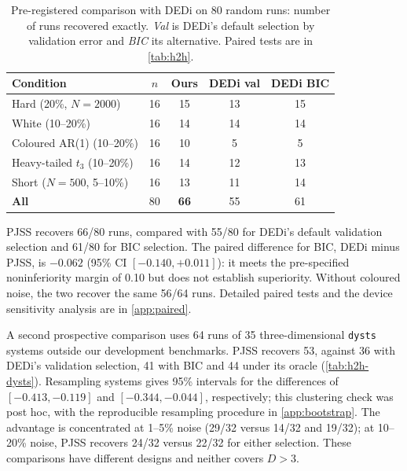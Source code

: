 \begin{table}[t]
\centering
\caption{Pre-registered comparison with DEDi on 80 random runs: number of runs recovered exactly. \emph{Val} is DEDi's default selection by validation error and \emph{BIC} its alternative. Paired tests are in \cref{tab:h2h}.}
\label{tab:dedi}
\small
\begin{tabular}{@{}lcccc@{}}
\toprule
Condition & $n$ & \textbf{Ours} & DEDi val & DEDi BIC \\
\midrule
Hard (20\%, $N=2000$) & 16 & 15 & 13 & 15 \\
White (10--20\%) & 16 & 14 & 14 & 14 \\
Coloured AR(1) (10--20\%) & 16 & 10 & 5 & 5 \\
Heavy-tailed $t_3$ (10--20\%) & 16 & 14 & 12 & 13 \\
Short ($N=500$, 5--10\%) & 16 & 13 & 11 & 14 \\
\midrule
\textbf{All} & 80 & \textbf{66} & 55 & 61 \\
\bottomrule
\end{tabular}
\end{table}

PJSS recovers 66/80 runs, compared with 55/80 for DEDi's default validation selection and 61/80 for BIC selection. The paired difference for BIC, DEDi minus PJSS, is $-0.062$ (95\% CI $[-0.140,+0.011]$): it meets the pre-specified noninferiority margin of 0.10 but does not establish superiority. Without coloured noise, the two recover the same 56/64 runs. Detailed paired tests and the device sensitivity analysis are in \cref{app:paired}.

A second prospective comparison uses 64 runs of 35 three-dimensional \texttt{dysts} systems outside our development benchmarks. PJSS recovers 53, against 36 with DEDi's validation selection, 41 with BIC and 44 under its oracle (\cref{tab:h2h-dysts}). Resampling systems gives 95\% intervals for the differences of $[-0.413,-0.119]$ and $[-0.344,-0.044]$, respectively; this clustering check was post hoc, with the reproducible resampling procedure in \cref{app:bootstrap}. The advantage is concentrated at 1--5\% noise (29/32 versus 14/32 and 19/32); at 10--20\% noise, PJSS recovers 24/32 versus 22/32 for either selection. These comparisons have different designs and neither covers $D>3$.

